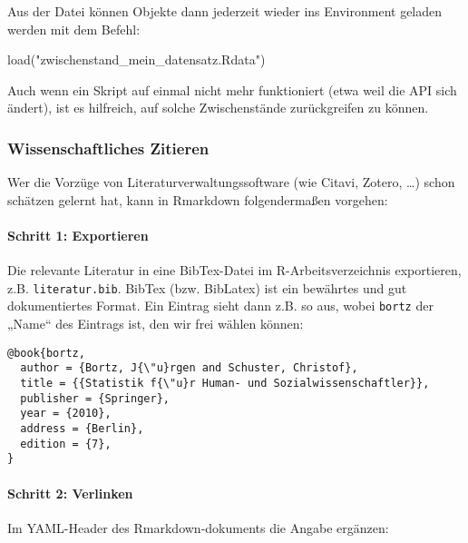\documentclass[11pt,german,a4paper]{article}
\newenvironment{Shaded}{\begin{snugshade}}{\end{snugshade}}
\newcommand{\FunctionTok}[1]{\textcolor[rgb]{0.00,0.00,0.00}{#1}}
\newcommand{\NormalTok}[1]{#1}
\newcommand{\StringTok}[1]{\textcolor[rgb]{0.31,0.60,0.02}{#1}}
\let\oldparagraph\paragraph
\renewcommand{\paragraph}[1]{\oldparagraph{#1}\mbox{}}
\begin{document}
Aus der Datei können Objekte dann jederzeit wieder ins Environment geladen werden mit dem Befehl:

\begin{Shaded}
\begin{Highlighting}[]
\FunctionTok{load}\NormalTok{(}\StringTok{"zwischenstand\_mein\_datensatz.Rdata"}\NormalTok{)}
\end{Highlighting}
\end{Shaded}

Auch wenn ein Skript auf einmal nicht mehr funktioniert (etwa weil die API sich ändert), ist es hilfreich, auf solche Zwischenstände zurückgreifen zu können.

\hypertarget{wissenschaftliches-zitieren}{%
\subsubsection{Wissenschaftliches Zitieren}\label{wissenschaftliches-zitieren}}

Wer die Vorzüge von Literaturverwaltungssoftware (wie Citavi, Zotero, \ldots) schon schätzen gelernt hat, kann in Rmarkdown folgendermaßen vorgehen:

\hypertarget{schritt-1-exportieren}{%
\paragraph{Schritt 1: Exportieren}\label{schritt-1-exportieren}}

Die relevante Literatur in eine BibTex-Datei im R-Arbeitsverzeichnis exportieren, z.B. \texttt{literatur.bib}. BibTex (bzw. BibLatex) ist ein bewährtes und gut dokumentiertes Format. Ein Eintrag sieht dann z.B. so aus, wobei \texttt{bortz} der „Name`` des Eintrags ist, den wir frei wählen können:

\begin{verbatim}
@book{bortz,
  author = {Bortz, J{\"u}rgen and Schuster, Christof},
  title = {{Statistik f{\"u}r Human- und Sozialwissenschaftler}},
  publisher = {Springer},
  year = {2010},
  address = {Berlin},
  edition = {7},
}
\end{verbatim}

\hypertarget{schritt-2-verlinken}{%
\paragraph{Schritt 2: Verlinken}\label{schritt-2-verlinken}}

Im YAML-Header des Rmarkdown-dokuments die Angabe ergänzen:
\end{document}
